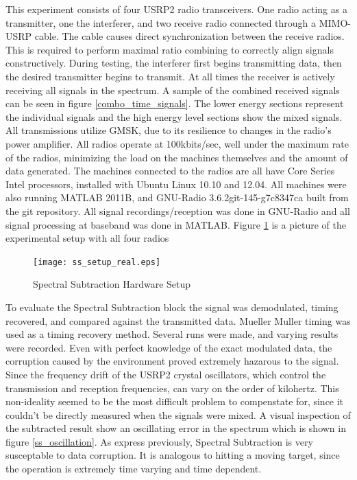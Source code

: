 This experiment consists of four USRP2 radio transceivers.  One radio acting as a transmitter, one the interferer, and two receive radio connected through a MIMO-USRP cable.  The cable causes direct synchronization between the receive radios.  This is required to perform maximal ratio combining to correctly align signals constructively.  During testing, the interferer first begins transmitting data, then the desired transmitter begins to transmit.  At all times the receiver is actively receiving all signals in the spectrum.  A sample of the combined received signals can be seen in figure \ref{combo_time_signals}.  The lower energy sections represent the individual signals and the high energy level sections show the mixed signals.\\

All transmissions utilize GMSK, due to its resilience to changes in the radio's power amplifier.  All radios operate at 100kbits/sec, well under the maximum rate of the radios, minimizing the load on the machines themselves and the amount of data generated.  The machines connected to the radios are all have Core Series Intel processors, installed with Ubuntu Linux 10.10 and 12.04.  All machines were also running MATLAB 2011B, and GNU-Radio 3.6.2git-145-g7c8347ca built from the git repository.  All signal recordings/reception was done in GNU-Radio and all signal processing at baseband was done in MATLAB.  Figure \ref{ss_setup_real} is a picture of the experimental setup with all four radios

\begin{figure}\label{ss_setup_real}
\texttt{[image: ss\_setup\_real.eps]}
\caption{Spectral Subtraction Hardware Setup}
\end{figure}

To evaluate the Spectral Subtraction block the signal was demodulated, timing recovered, and compared against the transmitted data.  Mueller Muller timing was used as a timing recovery method.  Several runs were made, and varying results were recorded.  Even with perfect knowledge of the exact modulated data, the corruption caused by the environment proved extremely hazarous to the signal.  Since the frequency drift of the USRP2 crystal oscillators, which control the transmission and reception frequencies, can vary on the order of kilohertz.  This non-ideality seemed to be the most difficult problem to compenstate for, since it couldn't be directly measured when the signals were mixed.  A visual inspection of the subtracted result show an oscillating error in the spectrum which is shown in figure \ref{ss_oscillation}.  As express previously, Spectral Subtraction is very susceptable to data corruption.  It is analogous to hitting a moving target, since the operation is extremely time varying and time dependent.\\  

